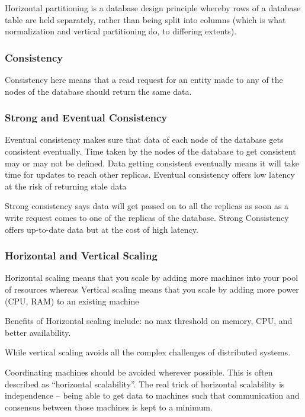 \documentclass{article}
\begin{document}
    Horizontal partitioning is a database design principle whereby rows of a database table are held separately, rather than being split into columns (which is what normalization and vertical partitioning do, to differing extents).
    
    \subsubsection{Consistency}
    Consistency here means that a read request for an entity made to any of the nodes of the database should return the same data. 
    
    \subsubsection{Strong and Eventual Consistency}
    Eventual consistency makes sure that data of each node of the database gets consistent eventually. Time taken by the nodes of the database to get consistent may or may not be defined. Data getting consistent eventually means it will take time for updates to reach other replicas. Eventual consistency offers low latency at the risk of returning stale data
    
    Strong consistency says data will get passed on to all the replicas as soon as a write request comes to one of the replicas of the database. Strong Consistency offers up-to-date data but at the cost of high latency.
    
    \subsubsection{Horizontal and Vertical Scaling}
    Horizontal scaling means that you scale by adding more machines into your pool of resources whereas Vertical scaling means that you scale by adding more power (CPU, RAM) to an existing machine 
    
    Benefits of Horizontal scaling include: no max threshold on memory, CPU, and better availability.
    
    While vertical scaling avoids all the complex challenges of distributed systems.
    
    Coordinating machines should be avoided wherever possible. This is often described as ``horizontal scalability”. The real trick of horizontal scalability is independence – being able to get data to machines such that communication and consensus between those machines is kept to a minimum. 
    
\end{document}
